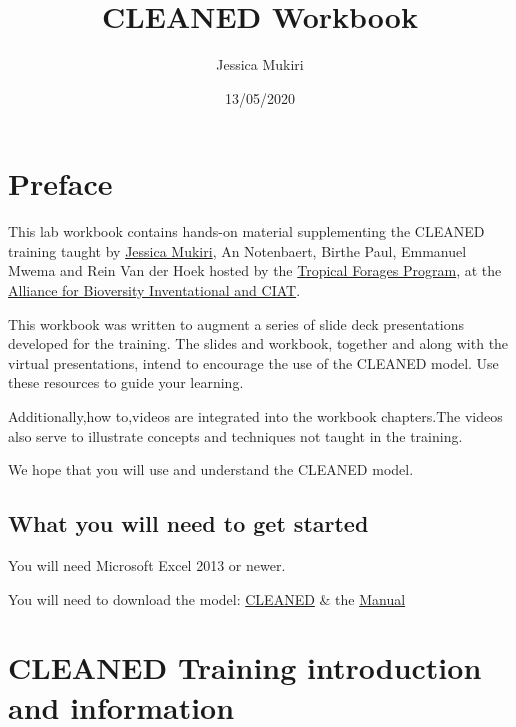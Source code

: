 \documentclass[
]{book}
\title{CLEANED Workbook}
\author{Jessica Mukiri}
\date{13/05/2020}
\begin{document}
\maketitle

{
\setcounter{tocdepth}{1}
\tableofcontents
}
\hypertarget{preface}{%
\chapter*{Preface}\label{preface}}

This lab workbook contains hands-on material supplementing the CLEANED training taught by \href{https://jmukiri.com/}{Jessica Mukiri}, An Notenbaert, Birthe Paul, Emmanuel Mwema and Rein Van der Hoek hosted by the \href{https://ciat.cgiar.org/what-we-do/forages-livestock/}{Tropical Forages Program}, at the \href{https://ciat.cgiar.org/alliance/}{Alliance for Bioversity Inventational and CIAT}.

This workbook was written to augment a series of slide deck presentations developed for the training. The slides and workbook, together and along with the virtual presentations, intend to encourage the use of the CLEANED model. Use these resources to guide your learning.

Additionally,how to,videos are integrated into the workbook chapters.The videos also serve to illustrate concepts and techniques not taught in the training.

We hope that you will use and understand the CLEANED model.

\hypertarget{what-you-will-need-to-get-started}{%
\section*{What you will need to get started}\label{what-you-will-need-to-get-started}}

You will need Microsoft Excel 2013 or newer.

You will need to download the model: \href{https://dataverse.harvard.edu/dataset.xhtml?persistentId=doi:10.7910/DVN/G0G8IY}{CLEANED} \& the \href{https://hdl.handle.net/10568/107238}{Manual}

\hypertarget{cleaned-training-introduction-and-information}{%
\chapter{CLEANED Training introduction and information}\label{cleaned-training-introduction-and-information}}
\end{document}
